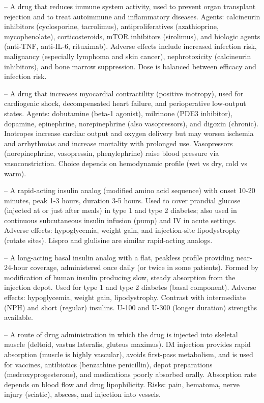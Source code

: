 -- A drug that reduces immune system activity, used to prevent organ transplant rejection and to treat autoimmune and inflammatory diseases. Agents: calcineurin inhibitors (cyclosporine, tacrolimus), antiproliferatives (azathioprine, mycophenolate), corticosteroids, mTOR inhibitors (sirolimus), and biologic agents (anti-TNF, anti-IL-6, rituximab). Adverse effects include increased infection risk, malignancy (especially lymphoma and skin cancer), nephrotoxicity (calcineurin inhibitors), and bone marrow suppression. Dose is balanced between efficacy and infection risk.

-- A drug that increases myocardial contractility (positive inotropy), used for cardiogenic shock, decompensated heart failure, and perioperative low-output states. Agents: dobutamine (beta-1 agonist), milrinone (PDE3 inhibitor), dopamine, epinephrine, norepinephrine (also vasopressors), and digoxin (chronic). Inotropes increase cardiac output and oxygen delivery but may worsen ischemia and arrhythmias and increase mortality with prolonged use. Vasopressors (norepinephrine, vasopressin, phenylephrine) raise blood pressure via vasoconstriction. Choice depends on hemodynamic profile (wet vs dry, cold vs warm).

-- A rapid-acting insulin analog (modified amino acid sequence) with onset 10-20 minutes, peak 1-3 hours, duration 3-5 hours. Used to cover prandial glucose (injected at or just after meals) in type 1 and type 2 diabetes; also used in continuous subcutaneous insulin infusion (pump) and IV in acute settings. Adverse effects: hypoglycemia, weight gain, and injection-site lipodystrophy (rotate sites). Lispro and glulisine are similar rapid-acting analogs.

-- A long-acting basal insulin analog with a flat, peakless profile providing near-24-hour coverage, administered once daily (or twice in some patients). Formed by modification of human insulin producing slow, steady absorption from the injection depot. Used for type 1 and type 2 diabetes (basal component). Adverse effects: hypoglycemia, weight gain, lipodystrophy. Contrast with intermediate (NPH) and short (regular) insulins. U-100 and U-300 (longer duration) strengths available.

-- A route of drug administration in which the drug is injected into skeletal muscle (deltoid, vastus lateralis, gluteus maximus). IM injection provides rapid absorption (muscle is highly vascular), avoids first-pass metabolism, and is used for vaccines, antibiotics (benzathine penicillin), depot preparations (medroxyprogesterone), and medications poorly absorbed orally. Absorption rate depends on blood flow and drug lipophilicity. Risks: pain, hematoma, nerve injury (sciatic), abscess, and injection into vessels.

